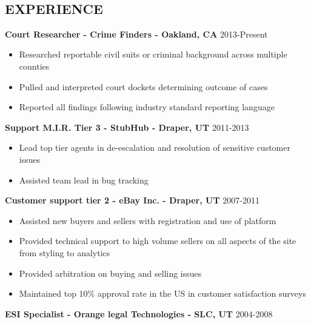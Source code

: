 \documentclass[line,margin]{res}
\begin{document}
\date{\today}
\address{\href{mailto:jefferycoombs@gmail.com}{jefferycoombs@gmail.com} \\ (415) 483-6437}\\

\begin{resume}

\section{EXPERIENCE}
 {\bf Court Researcher - Crime Finders - Oakland, CA} \hfill 2013-Present\\
  \begin{itemize} \itemsep -2pt %
  \item Researched reportable civil suits or criminal background across multiple counties
  \item Pulled and interpreted court dockets determining outcome of cases
  \item Reported all findings following industry standard reporting language
  \end{itemize}
 {\bf Support M.I.R. Tier 3 - StubHub - Draper, UT} \hfill 2011-2013\\
  \begin{itemize} \itemsep -2pt %
  \item Lead top tier agents in de-escalation and resolution of sensitive customer issues
  \item Assisted team lead in bug tracking
  \end{itemize}
 {\bf Customer support tier 2 - eBay Inc. - Draper, UT} \hfill 2007-2011\\
   \begin{itemize} \itemsep -2pt
   \item Assisted new buyers and sellers with registration and use of platform
   \item Provided technical support to high volume sellers on all aspects of the site from styling to analytics
   \item Provided arbitration on buying and selling issues
   \item Maintained top 10\% approval rate in the US in customer satisfaction surveys
   \end{itemize}
 {\bf ESI Specialist - Orange legal Technologies - SLC, UT} \hfill 2004-2008\\

\end{resume}
\end{document}
